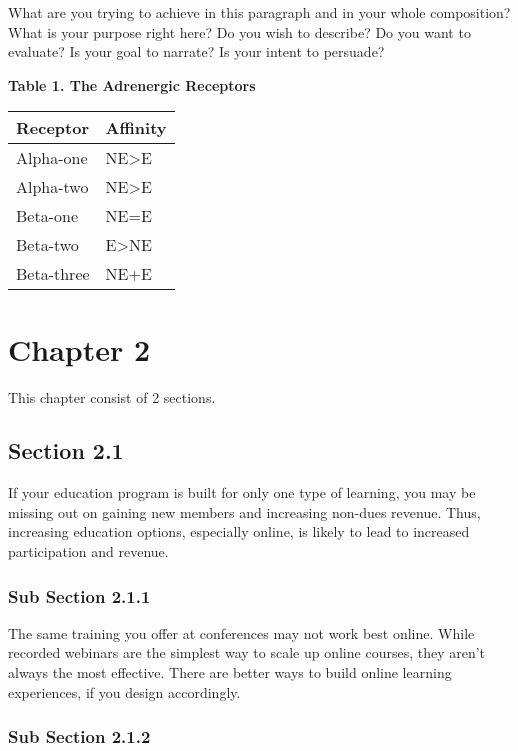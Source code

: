 What are you trying to achieve in this paragraph and in your whole composition? What is your purpose right here? Do you wish to describe? Do you want to evaluate? Is your goal to narrate? Is your intent to persuade?

\textbf{Table 1. The Adrenergic Receptors}
\begin{table}
    \begin{tabular}{|l|l|}
    \hline
    \textbf{Receptor}   & \textbf{Affinity} \\ \hline
    Alpha-one  & NE>E \\ \hline
    Alpha-two  & NE>E \\ \hline
    Beta-one   & NE=E \\ \hline
    Beta-two   & E>NE \\ \hline
    Beta-three & NE+E \\ \hline
    \end{tabular}
\end{table}

\chapter{Chapter 2}
\label{chapter:2}

This chapter consist of 2 sections.

\section{Section 2.1}
\label{section:2-1}

If your education program is built for only one type of learning, you may be missing out on gaining new members and increasing non-dues revenue. Thus, increasing education options, especially online, is likely to lead to increased participation and revenue.

\subsection{Sub Section 2.1.1}
\label{subsection:2-2-1}

The same training you offer at conferences may not work best online. While recorded webinars are the simplest way to scale up online courses, they aren't always the most effective. There are better ways to build online learning experiences, if you design accordingly. 

\subsection{Sub Section 2.1.2}
\label{subsection:2-2-2}

